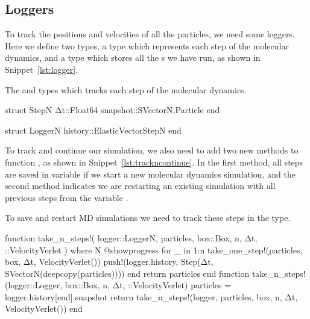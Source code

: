\subsection{Loggers}

To track the positions and velocities of all the particles, we need some loggers.
Here we define two types, a  type which represents each step of the molecular
dynamics, and a  type which stores all the s we have run,
as shown in Snippet~\ref{lst:logger}.

\begin{algorithm}
    \caption{The  and  types which tracks each step of the
        molecular dynamics.}
    \label{lst:logger}
    \begin{juliacode}
        struct Step{N}
            Δt::Float64
            snapshot::SVector{N,Particle}
        end

        struct Logger{N}
            history::ElasticVector{Step{N}}
        end
    \end{juliacode}
\end{algorithm}

To track and continue our simulation, we also need to add two new methods to function
, as shown in Snippet~\ref{lst:trackncontinue}.
In the first method, all steps are saved in variable  if we start a new
molecular dynamics simulation, and the second method indicates we are restarting an
existing simulation with all previous steps from the variable .

\begin{algorithm}
    \caption{To save and restart MD simulations we need to track these steps
        in the  type.}
    \label{lst:trackncontinue}
    \begin{juliacode}
        function take_n_steps!(
            logger::Logger{N}, particles, box::Box, n, Δt, ::VelocityVerlet
        ) where {N}
            @showprogress for _ in 1:n
                take_one_step!(particles, box, Δt, VelocityVerlet())
                push!(logger.history, Step(Δt, SVector{N}(deepcopy(particles))))
            end
            return particles
        end
        function take_n_steps!(logger::Logger, box::Box, n, Δt, ::VelocityVerlet)
            particles = logger.history[end].snapshot
            return take_n_steps!(logger, particles, box, n, Δt, VelocityVerlet())
        end
    \end{juliacode}
\end{algorithm}

